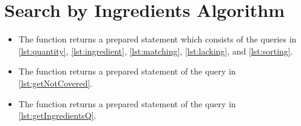 \chapter{Search by Ingredients Algorithm}\label{app:search}
\begin{itemize}[leftmargin=*]
\item The function  returns a prepared statement which consists of the queries in \autoref{lst:quantity}, \autoref{lst:ingredient}, \autoref{lst:matching}, \autoref{lst:lacking}, and \autoref{lst:sorting}.

\item The function  returns a prepared statement of the query in \autoref{lst:getNotCovered}.

\item The function  returns a prepared statement of the query in \autoref{lst:getIngredientsQ}.
\end{itemize}

